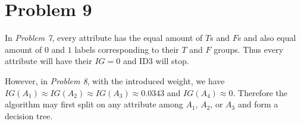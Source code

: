 \documentclass[12pt]{article}
\begin{document}
\section{Problem 9}

In \textit{Problem 7}, every attribute has the equal amount of $T$s and $F$s and also equal amount of $0$ and $1$ labels corresponding to their $T$ and $F$ groups. Thus every attribute will have their $IG = 0$ and ID3 will stop.

However, in \textit{Problem 8}, with the introduced weight, we have $IG(A_1) \approx IG(A_2) \approx IG(A_3) \approx 0.0343$ and $IG(A_4) \approx 0$. Therefore the algorithm may first split on any attribute among $A_1$, $A_2$, or $A_3$ and form a decision tree.



% 
% 
\end{document}

